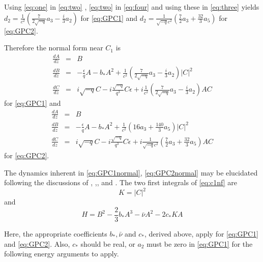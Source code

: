 Using \eqref{eq:one} in \eqref{eq:two} , \eqref{eq:two} in \eqref{eq:four} and using these in \eqref{eq:three} yields 
$ d_2 = \frac{1}{c^2}\left( \frac{7}{2 \sqrt{-q} } a_3 - \frac{i}{3} a_2 \right)$ for \eqref{eq:GPC1} and 
$ d_2 = \frac{1}{\sqrt{-q} c^2}\left( \frac{7}{2 } a_3 + \frac{32}{3} a_5 \right)$  for \eqref{eq:GPC2}. 

Therefore the normal form near $C_1$ is 
\begin{subequations}\label{eq:GPC1normal}
\begin{eqnarray} \label{eq:GPC1normalA}
\frac{dA}{dz} &=& B \\ 
\frac{dB}{dz} &=& -\frac{\epsilon}{q} A - b_* A^2 + \frac{1}{c^2}\left( \frac{7}{2 \sqrt{-q} } a_3 - \frac{i}{3} a_2 \right)  \left|C\right|^2 \\ \label{eq:GPC1normalB}
\frac{dC}{dz} &=& i \sqrt{-q} C - i \frac{\sqrt{-q} }{q^3} C\epsilon + i \frac{1}{c^2}\left( \frac{7}{2 \sqrt{-q} } a_3 - \frac{i}{3} a_2 \right)A C \label{eq:GPC1normalC}
\end{eqnarray}
\end{subequations}
for \eqref{eq:GPC1} and
\begin{subequations}\label{eq:GPC2normal}
\begin{eqnarray} \label{eq:GPC2normalA}
\frac{dA}{dz} &=& B \\ 
\frac{dB}{dz} &=& -\frac{\epsilon}{q} A - b_* A^2 + \frac{1}{c^2}\left( 16 a_3 + \frac{140}{3} a_5 \right)  \left|C\right|^2 \\ \label{eq:GPC2normalB}
\frac{dC}{dz} &=& i \sqrt{-q} C - i \frac{\sqrt{-q} }{q^3} C\epsilon + i \frac{1}{\sqrt{-q} c^2}\left( \frac{7}{2 } a_3 + \frac{32}{3} a_5 \right)A C \label{eq:GPC2normalC}
\end{eqnarray}
\end{subequations}
for \eqref{eq:GPC2}.

The dynamics inherent in \eqref{eq:GPC1normal}, \eqref{eq:GPC2normal} may be elucidated following the discussions of \cite{IK}, \cite{Lombardi1},\cite{Lombardi2}, and \cite{IA}.
The two first integrals of \eqref{eq:c1nf}  are
\begin{equation}
K = \left| C \right|^2
\end{equation}
and
\begin{equation}
H = B^2 - \frac{2}{3} b_* A^3 - \bar{\nu} A^2 - 2 c_* K A
\end{equation}

Here, the appropriate coefficients $b_*, \bar{\nu}$ and $ c_*$, derived above, apply for \eqref{eq:GPC1} and \eqref{eq:GPC2}. 
Also, $c_*$ should be real, or $a_2$ must be zero in \eqref{eq:GPC1} for the following energy arguments to apply.


